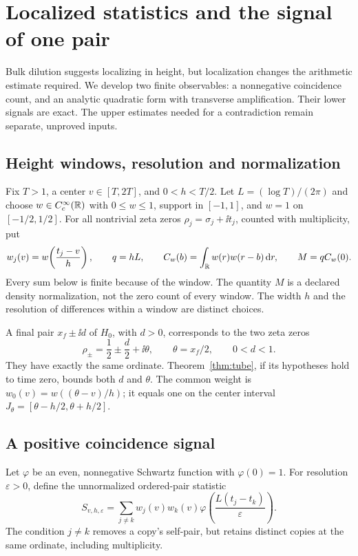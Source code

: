 \section{Localized statistics and the signal of one pair}
\label{sec:localized}

Bulk dilution suggests localizing in height, but localization changes
the arithmetic estimate required. We develop two finite observables:
a nonnegative coincidence count, and an analytic quadratic form with
transverse amplification. Their lower signals are exact. The upper
estimates needed for a contradiction remain separate, unproved inputs.

\subsection{Height windows, resolution and normalization}
Fix \(T>1\), a center \(v\in[T,2T]\), and \(0<h<T/2\). Let
\(L=(\log T)/(2\pi)\) and choose \(w\in C_c^\infty(\mathbb R)\) with
\(0\le w\le1\), support in \([-1,1]\), and \(w=1\) on
\([-1/2,1/2]\). For all nontrivial zeta zeros
\(\rho_j=\sigma_j+\ii t_j\), counted with multiplicity, put
\begin{equation}\label{eq:local-window}
 w_j(v)=w\!\left(\frac{t_j-v}{h}\right),\qquad
 q=hL,\qquad C_w(b)=\int_\mathbb R w(r)w(r-b)\,\mathrm d r,\qquad M=qC_w(0).
\end{equation}
Every sum below is finite because of the window. The quantity \(M\)
is a declared density normalization, not the zero count of every window.
The width \(h\) and the resolution of differences within a window
are distinct choices.

A final pair \(x_f\pm\ii d\) of \(H_0\), with \(d>0\),
corresponds to the two zeta zeros
\begin{equation}\label{eq:localized-pair}
 \rho_\pm=\frac12\pm\frac d2+\ii\theta,\qquad
 \theta=x_f/2,\qquad 0<d<1.
\end{equation}
They have exactly the same ordinate. Theorem~\ref{thm:tube}, if its
hypotheses hold to time zero, bounds both \(d\) and \(\theta\).
The common weight is \(w_0(v)=w((\theta-v)/h)\); it equals one on
the center interval \(J_\theta=[\theta-h/2,\theta+h/2]\).

\subsection{A positive coincidence signal}
Let \(\varphi\) be an even, nonnegative Schwartz function with
\(\varphi(0)=1\). For resolution \(\varepsilon>0\), define the
unnormalized ordered-pair statistic
\begin{equation}\label{eq:local-S}
 S_{v,h,\varepsilon}
 =\sum_{j\ne k}w_j(v)w_k(v)
       \varphi\!\left(\frac{L(t_j-t_k)}{\varepsilon}\right).
\end{equation}
The condition \(j\ne k\) removes a copy's self-pair, but retains
distinct copies at the same ordinate, including multiplicity.

